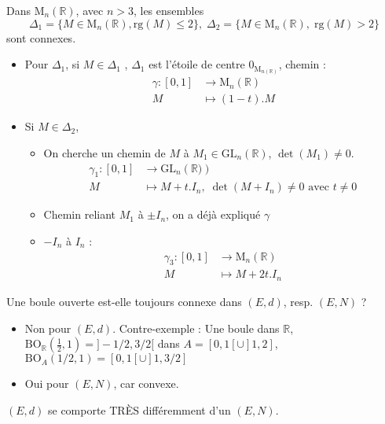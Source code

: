 \begin{question}{}{}
Dans $\mathrm{M} _n(\mathbb{R} )$, avec $n > 3$, les ensembles 
 \[
     \Delta_1 = \{M \in \mathrm{M} _n(\mathbb{R} ), \mathrm{rg}(M) \le 2 \},\;\Delta_2 = \{M \in \mathrm{M} _n(\mathbb{R} ),\; \mathrm{rg} (M) > 2\}
\]
sont connexes.

\end{question}

\begin{myproof}
\begin{itemize}
    \item Pour $\Delta_1$, si $M \in \Delta_1$ , $\Delta_1$ est l'étoile de centre  $0_{\mathrm{M} _{n(\mathbb{R} )}}$, chemin :
        \begin{align*}
            \gamma : [0,1] &\to  \mathrm{M} _n(\mathbb{R} ) \\
            M &\mapsto (1-t).M
        \end{align*}
        
    \item Si $M \in \Delta_2$,
        \begin{itemize}
            \item On cherche un chemin de $M$ à  $M_1 \in \mathrm{GL} _n(\mathbb{R} )$, $\det (M_1) \ne 0$.
             \begin{align*}
                 \gamma_1 : [0,1] &\to \mathrm{GL}_n(\mathbb{R)} ) \\
                 M &\mapsto M + t.I_n,\; \det(M + I_n) \ne 0 \text{ avec } t \ne 0
            \end{align*}

        \item Chemin reliant $M_1$ à $\pm I_n$, on a déjà expliqué  $\gamma$ 
        \item $-I_n$ à $I_n$ :
            \begin{align*}
                \gamma_3 : [0,1] &\to  \mathrm{M} _n(\mathbb{R} ) \\
                M &\mapsto M + 2t.I_n
            \end{align*}
            
        \end{itemize}
\end{itemize}
\end{myproof}
\begin{question}{}{}
Une boule ouverte est-elle toujours connexe dans $(E,d)$, resp. $(E,N)$ ?
\end{question}
\begin{myproof}
    \begin{itemize}
        \item Non pour $(E,d)$. Contre-exemple : Une boule dans $\mathbb{R} $, $\mathrm{BO} _{\mathbb{R} }( \frac{1}{2} ,1 ) = ]- 1 / 2, 3 / 2[$ dans $A = [0, 1 [ \cup ]1, 2]$,  $\mathrm{BO} _A ( 1 / 2 , 1 ) = [0, 1 [ \cup ]1, 3 / 2]$
        \item Oui pour $(E, N)$, car convexe.
    \end{itemize}
    
\begin{note}
$(E,d)$ se comporte TRÈS différemment d'un  $(E,N)$.
\end{note}
\end{myproof}

